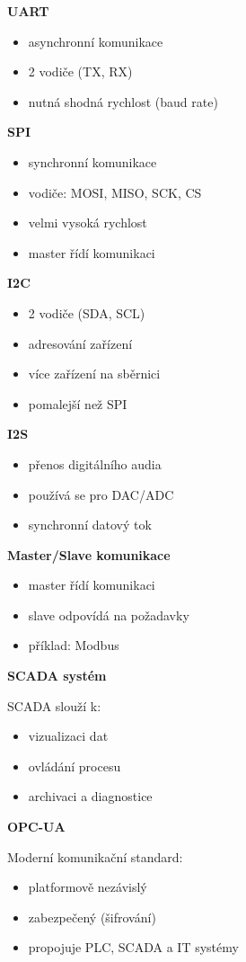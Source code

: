 \documentclass[a4paper,10pt]{article}
\begin{document}
\begin{vysvetlenibox}
\textbf{UART}
\begin{itemize}
\item asynchronní komunikace
\item 2 vodiče (TX, RX)
\item nutná shodná rychlost (baud rate)
\end{itemize}

\textbf{SPI}
\begin{itemize}
\item synchronní komunikace
\item vodiče: MOSI, MISO, SCK, CS
\item velmi vysoká rychlost
\item master řídí komunikaci
\end{itemize}

\textbf{I2C}
\begin{itemize}
\item 2 vodiče (SDA, SCL)
\item adresování zařízení
\item více zařízení na sběrnici
\item pomalejší než SPI
\end{itemize}

\textbf{I2S}
\begin{itemize}
\item přenos digitálního audia
\item používá se pro DAC/ADC
\item synchronní datový tok
\end{itemize}

\textbf{Master/Slave komunikace}

\begin{itemize}
\item master řídí komunikaci
\item slave odpovídá na požadavky
\item příklad: Modbus
\end{itemize}

\textbf{SCADA systém}

SCADA slouží k:
\begin{itemize}
\item vizualizaci dat
\item ovládání procesu
\item archivaci a diagnostice
\end{itemize}

\textbf{OPC-UA}

Moderní komunikační standard:
\begin{itemize}
\item platformově nezávislý
\item zabezpečený (šifrování)
\item propojuje PLC, SCADA a IT systémy
\end{itemize}

\end{vysvetlenibox}
\end{document}
